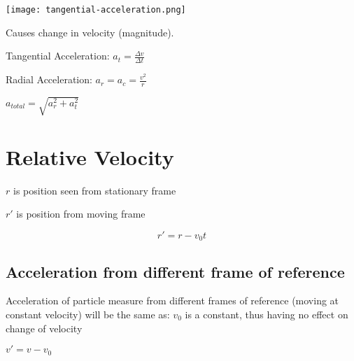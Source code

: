 \documentclass[12pt]{article}
\begin{document}
\begin{spacing}{1.5}
\texttt{[image: tangential-acceleration.png]}

Causes change in velocity (magnitude). 

Tangential Acceleration: $a_t = \frac{\Delta v}{\Delta t}$

Radial Acceleration: $a_r = a_c = \frac{v^2}{r}$

$a_{total} = \sqrt{a_r^2 + a_t^2}$

\section{Relative Velocity}

\begin{itemize*}
	\item $r$ is position seen from stationary frame
	\item $r'$ is position from moving frame 
\end{itemize*}

$$r' = r - v_0 t$$

\subsection{Acceleration from different frame of reference}

Acceleration of particle measure from different frames of reference (moving at constant velocity) will be the same as: $v_0$ is a constant, thus having no effect on change of velocity

$v' = v - v_0$

\end{spacing}
\end{document}
